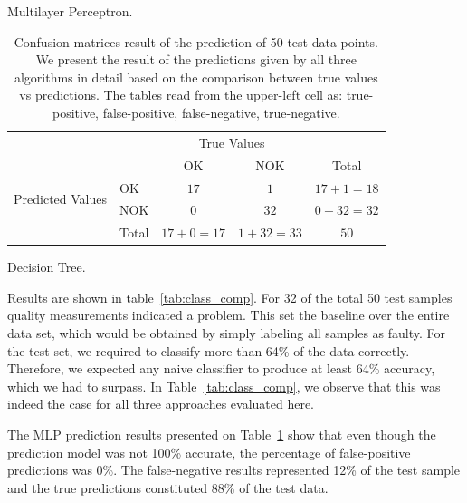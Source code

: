 \documentclass[5p,times,procedia]{elsarticle}
\begin{document}
\begin{table}
\begin{subtable}[h]{0.3\textwidth}
              \caption{Multilayer Perceptron.}
              \label{tab:MPL_conf_matrix}
       \end{subtable}
       \begin{subtable}[h]{0.3\textwidth}
              \centering
              \begin{adjustbox}{width=1.6\textwidth}
              \begin{tabular}{l|l|c|c|c}
                     \multicolumn{2}{c}{}&\multicolumn{2}{c}{True Values}&\\
                     \cline{3-4}
                     \multicolumn{2}{c|}{}& OK & NOK &\multicolumn{1}{c}{Total}\\
                     \cline{2-4}
                     \multirow{2}{*}{Predicted Values}& OK & $17$ & $1$ & $17+1 = 18$\\
                     \cline{2-4}
                     & NOK & $0$ & $32$ & $0+32 = 32$\\
                     \cline{2-4}
                     \multicolumn{1}{c}{} & \multicolumn{1}{c}{Total} & \multicolumn{1}{c}{$17+0 = 17$} & \multicolumn{    1}{c}{$1+32 = 33$} & \multicolumn{1}{c}{$50$}\\
              \end{tabular}
              \end{adjustbox}
              \caption{Decision Tree.}
              \label{tab:Tree_conf_matrix}
       \end{subtable}
       \caption{Confusion matrices result of the prediction of 50 test data-points. We present the result of the predictions given by all three algorithms in detail based on the comparison between true values vs predictions. The tables read from the upper-left cell as: true-positive, false-positive, false-negative, true-negative.}
       \label{tab:Confusion_matrix}
\end{table}


Results are shown in table~\ref{tab:class_comp}. For 32 of the total 50 test samples
quality measurements indicated a problem. This set the 
baseline over the entire data set, which would be obtained by simply labeling all samples
as faulty. For the test set, we required to classify more than 64\% of the data correctly.
Therefore, we expected any naive classifier to produce at least 64\% accuracy, which we had to surpass. In Table~\ref{tab:class_comp}, we observe that this was indeed the case for all three approaches evaluated here.

The MLP prediction results presented on Table~\ref{tab:Confusion_matrix} show that even though the prediction model was not 100\% accurate, the percentage of false-positive predictions was 0\%. The false-negative results represented 12\% of the test sample and the true predictions constituted 88\% of the test data.
\end{document}
